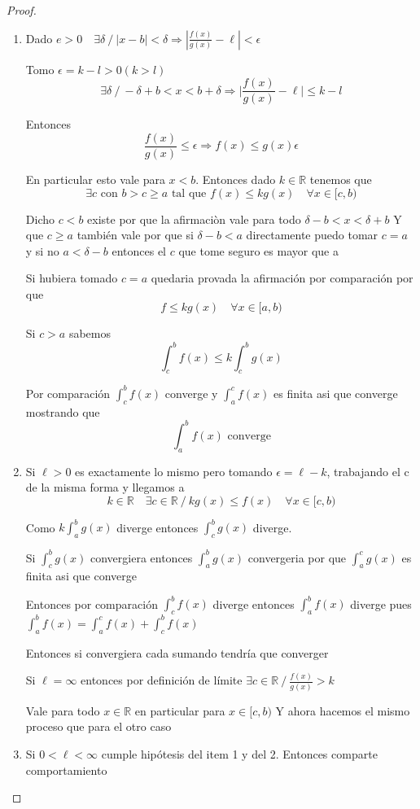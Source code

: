 \documentclass{article}
\theoremstyle{break}
\begin{document}
\begin{proof}
	\begin{enumerate}
		\item Dado $e>0 \quad \exists \delta \ / \ |x-b|<\delta \Rightarrow 
		|\frac{f(x)}{g(x)}-\ell| < \epsilon$ 

		Tomo $\epsilon = k - l > 0 (k>l)$
		\[ \exists \delta \ / \ -\delta + b< x < b+\delta \Rightarrow 
		\bigg|\frac{f(x)}{g(x)} - \ell\bigg| \leq k-l \]

		Entonces \[ \frac{f(x)}{g(x)}\leq \epsilon \Rightarrow f(x) \leq g(x)\epsilon \]

		En particular esto vale para $x<b$. Entonces dado $k\in \mathbb{R}$ tenemos que
		\[\exists c \text{ con } b> c \geq a \text{ tal que } f(x)\leq k g(x) \quad \forall x \in [c,b)\]

		Dicho $c<b$ existe por que la afirmaciòn vale para todo $\delta - b<x<\delta + b$ 
		Y que $c\geq a$ también vale por que si $\delta -b < a $ directamente puedo tomar $c=a$
		y si no $a < \delta -b$ entonces el $c$ que tome seguro es mayor que a

		Si hubiera tomado $c=a$ quedaria provada la afirmación por comparación por que
		\[ f \leq k g(x)\quad \forall x \in [a,b)\]

		Si $c>a$ sabemos \[ \int_{c}^{b} f(x)\leq k\int_{c}^{b} g(x) \]

		Por comparación $\int_{c}^{b} f(x)$ converge y $\int_{a}^{c} f(x)$ es finita asi que converge
		mostrando que \[ \int_{a}^{b} f(x) \text{ converge} \]

		\item Si $\ell > 0 $ es exactamente lo mismo pero tomando $\epsilon = \ell -k$, trabajando el c de la
		misma forma y llegamos a 
		\[k\in \mathbb{R} \quad \exists c\in \mathbb{R}\ / \ kg(x)\leq f(x) \quad \forall x\in[c,b)\] 

		Como $k\int_{a}^{b} g(x)$ diverge entonces $\int_{c}^{b}g(x) $ diverge.

		Si $\int_{c}^{b} g(x)$ convergiera entonces $\int_{a}^{b} g(x)$ convergeria por que
		$\int_{a}^{c} g(x)$ es finita asi que converge

		Entonces por comparación $\int_{c}^{b} f(x)$ diverge entonces $\int_{a}^{b} f(x)$ diverge
		pues $\int_{a}^{b} f(x) = \int_{a}^{c} f(x) + \int_{c}^{b} f(x)$ 
	
		Entonces si convergiera	cada sumando tendría que converger
		
		Si $\ell = \infty$ entonces por definición de límite
		$\exists c \in \mathbb{R} \ / \ \frac{f(x)}{g(x)} > k $
	
		Vale para todo $x\in \mathbb{R}$ en particular para $x\in[c,b)$
		Y ahora hacemos el mismo proceso que para el otro caso
		\item Si $0<\ell<\infty$ cumple hipótesis del item 1 y del 2. Entonces comparte comportamiento
	\end{enumerate}
\end{proof}
\end{document}
